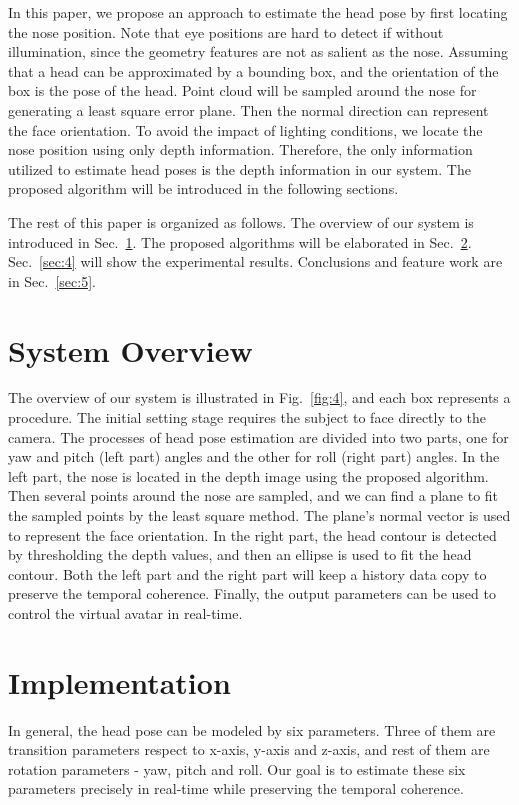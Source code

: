 In this paper, we propose an approach to estimate the head pose by first locating the nose position. Note that eye positions are hard to detect if without illumination, since the geometry features are not as salient as the nose. Assuming that a head can be approximated by a bounding box, and the orientation of the box is the pose of the head. Point cloud will be sampled around the nose for generating a least square error plane. Then the normal direction can represent the face orientation. To avoid the impact of lighting conditions, we locate the nose position using only depth information.  Therefore, the only information utilized to estimate head poses is the depth information in our system. The proposed algorithm will be introduced in the following sections.

The rest of this paper is organized as follows. The overview of our system is introduced in Sec.~\ref{sec:2}. The proposed algorithms will be elaborated in Sec.~\ref{sec:3}. Sec.~\ref{sec:4} will show the experimental results. Conclusions and feature work are in Sec.~\ref{sec:5}.


\section{System Overview}
\label{sec:2}
The overview of our system is illustrated in Fig.~\ref{fig:4}, and each box represents a procedure. The initial setting stage requires the subject to face directly to the camera. The processes of head pose estimation are divided into two parts, one for yaw and pitch (left part) angles and the other for roll (right part) angles. In the left part, the nose is located in the depth image using the proposed algorithm. Then several points around the nose are sampled, and we can find a plane to fit the sampled points by the least square method. The plane’s normal vector is used to represent the face orientation. In the right part, the head contour is detected by thresholding the depth values, and then an ellipse is used to fit the head contour. Both the left part and the right part will keep a history data copy to preserve the temporal coherence. Finally, the output parameters can be used to control the virtual avatar in real-time.


\section{Implementation}
\label{sec:3}
In general, the head pose can be modeled by six parameters. Three of them are transition parameters respect to x-axis, y-axis and z-axis, and rest of them are rotation parameters - yaw, pitch and roll. Our goal is to estimate these six parameters precisely in real-time while preserving the temporal coherence.

